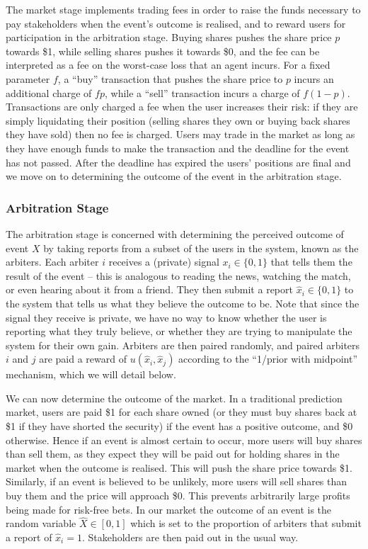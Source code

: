 \documentclass[10pt,a4paper]{article}
\theoremstyle{plain}
\theoremstyle{definition}
\begin{document}
The market stage implements trading fees in order to raise the funds necessary
to pay stakeholders when the event's outcome is realised, and to reward users
for participation in the arbitration stage. Buying shares pushes the share
price $p$ towards \$1, while selling shares pushes it towards \$0, and the fee
can be interpreted as a fee on the worst-case loss that an agent incurs. For a
fixed parameter $f$, a ``buy'' transaction that pushes the share price to $p$
incurs an additional charge of $fp$, while a ``sell'' transaction incurs a
charge of $f(1-p)$. Transactions are only charged a fee when the user increases
their risk: if they are simply liquidating their position (selling shares they
own or buying back shares they have sold) then no fee is charged.  Users may
trade in the market as long as they have enough funds to make the transaction
and the deadline for the event has not passed. After the deadline has expired
the users' positions are final and we move on to determining the outcome of the
event in the arbitration stage.

\subsubsection{Arbitration Stage}

The arbitration stage is concerned with determining the perceived outcome of
event $X$ by taking reports from a subset of the users in the system, known as
the arbiters. Each arbiter $i$ receives a (private) signal $x_i \in \{0,1\}$
that tells them the result of the event -- this is analogous to reading the
news, watching the match, or even hearing about it from a friend. They then
submit a report $\hat{x}_i \in \{0,1\}$ to the system that tells us what they
believe the outcome to be. Note that since the signal they receive is private,
we have no way to know whether the user is reporting what they truly believe,
or whether they are trying to manipulate the system for their own gain.
Arbiters are then paired randomly, and paired arbiters $i$ and $j$ are paid a
reward of $u(\hat{x}_i, \hat{x}_j)$ according to the ``1/prior with midpoint''
mechanism, which we will detail below.

We can now determine the outcome of the market. In a traditional prediction
market, users are paid \$1 for each share owned (or they must buy shares back
at \$1 if they have shorted the security) if the event has a positive outcome,
and \$0 otherwise. Hence if an event is almost certain to occur, more users
will buy shares than sell them, as they expect they will be paid out for
holding shares in the market when the outcome is realised. This will push the
share price towards \$1. Similarly, if an event is believed to be unlikely,
more users will sell shares than buy them and the price will approach \$0. This
prevents arbitrarily large profits being made for risk-free bets. In our market
the outcome of an event is the random variable $\hat{X} \in [0,1]$ which is set
to the proportion of arbiters that submit a report of $\hat{x}_i=1$.
Stakeholders are then paid out in the usual way.
\end{document}
